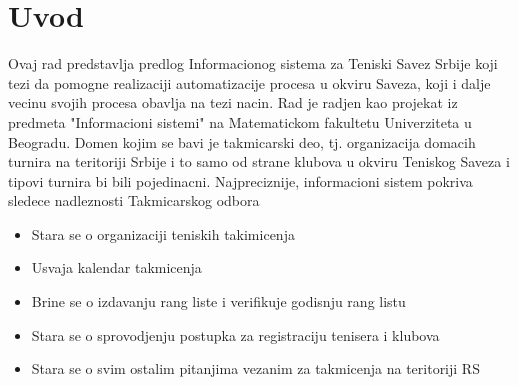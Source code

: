 \documentclass{article}
\begin{document}
\section{Uvod}
Ovaj rad predstavlja predlog Informacionog sistema za Teniski Savez Srbije koji tezi da pomogne realizaciji automatizacije procesa u okviru Saveza, koji i dalje vecinu svojih procesa obavlja na tezi nacin. Rad je radjen kao projekat iz predmeta "Informacioni sistemi" na Matematickom fakultetu Univerziteta u Beogradu. Domen kojim se bavi je takmicarski deo, tj. organizacija domacih turnira na teritoriji Srbije i to samo od strane klubova u okviru Teniskog Saveza i tipovi turnira bi bili pojedinacni. 
Najpreciznije, informacioni sistem pokriva sledece nadleznosti Takmicarskog odbora
\begin{itemize}
\item Stara se o organizaciji teniskih takimicenja
\item Usvaja kalendar takmicenja
\item Brine se o izdavanju rang liste i verifikuje godisnju rang listu
\item Stara se o sprovodjenju postupka za registraciju tenisera i klubova
\item Stara se o svim ostalim pitanjima vezanim za takmicenja na teritoriji RS   
\end{itemize}
\end{document}
